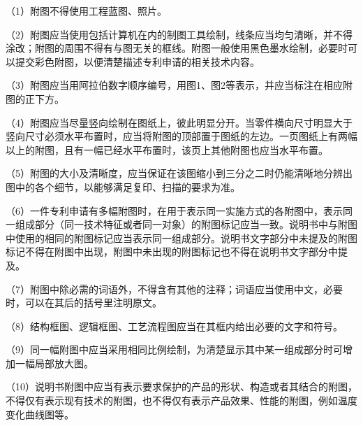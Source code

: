 {\setlength{\parindent}{17.1bp}（1）附图不得使用工程蓝图、照片。\par}

{\setlength{\parindent}{17.1bp}（2）附图应当使用包括计算机在内的制图工具绘制，线条应当均匀清晰，并不得涂改；附图的周围不得有与图无关的框线。附图一般使用黑色墨水绘制，必要时可以提交彩色附图，以便清楚描述专利申请的相关技术内容。\par}

{\setlength{\parindent}{17.1bp}（3）附图应当用阿拉伯数字顺序编号，用图1、图2等表示，并应当标注在相应附图的正下方。\par}

{\setlength{\parindent}{17.1bp}（4）附图应当尽量竖向绘制在图纸上，彼此明显分开。当零件横向尺寸明显大于竖向尺寸必须水平布置时，应当将附图的顶部置于图纸的左边。一页图纸上有两幅以上的附图，且有一幅已经水平布置时，该页上其他附图也应当水平布置。\par}

{\setlength{\parindent}{17.1bp}（5）附图的大小及清晰度，应当保证在该图缩小到三分之二时仍能清晰地分辨出图中的各个细节，以能够满足复印、扫描的要求为准。\par}

{\setlength{\parindent}{17.1bp}（6）一件专利申请有多幅附图时，在用于表示同一实施方式的各附图中，表示同一组成部分（同一技术特征或者同一对象）的附图标记应当一致。说明书中与附图中使用的相同的附图标记应当表示同一组成部分。说明书文字部分中未提及的附图标记不得在附图中出现，附图中未出现的附图标记也不得在说明书文字部分中提及。\par}

{\setlength{\parindent}{17.1bp}（7）附图中除必需的词语外，不得含有其他的注释；词语应当使用中文，必要时，可以在其后的括号里注明原文。\par}

{\setlength{\parindent}{17.1bp}（8）结构框图、逻辑框图、工艺流程图应当在其框内给出必要的文字和符号。\par}

{\setlength{\parindent}{17.1bp}（9）同一幅附图中应当采用相同比例绘制，为清楚显示其中某一组成部分时可增加一幅局部放大图。\par}

{\setlength{\parindent}{17.1bp}（10）说明书附图中应当有表示要求保护的产品的形状、构造或者其结合的附图，不得仅有表示现有技术的附图，也不得仅有表示产品效果、性能的附图，例如温度变化曲线图等。\par}

